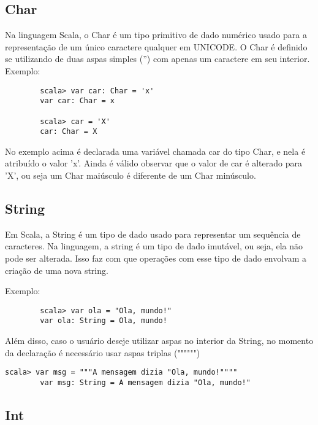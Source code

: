     \subsection{Char}
    Na linguagem Scala, o Char \'{e} um tipo primitivo de dado num\'{e}rico usado para a representa\c{c}\~{a}o de um \'{u}nico caractere qualquer em UNICODE. O Char \'{e} definido se utilizando de duas aspas simples ('') com apenas um caractere em seu interior.
    Exemplo:
    
    \begin{lstlisting}
    	scala> var car: Char = 'x'
    	var car: Char = x
    	
    	scala> car = 'X'
    	car: Char = X
    \end{lstlisting}
	
	No exemplo acima \'{e} declarada uma vari\'{a}vel chamada car do tipo Char, e nela \'{e} atribu\'{i}do o valor 'x'. Ainda \'{e} v\'{a}lido observar que o valor de car \'{e} alterado para 'X', ou seja um Char mai\'{u}sculo \'{e} diferente de um Char min\'{u}sculo.
	
	\subsection{String}
	
	Em Scala, a String \'{e} um tipo de dado usado para representar um sequ\^{e}ncia de caracteres. Na linguagem, a string \'{e} um tipo de dado imut\'{a}vel, ou seja, ela não pode ser alterada. Isso faz com que opera\c{c}\~{o}es com esse tipo de dado envolvam a cria\c{c}\~{a}o de uma nova string.
    
    Exemplo:
    
    \begin{lstlisting}
    	scala> var ola = "Ola, mundo!"
    	var ola: String = Ola, mundo!
    \end{lstlisting}

	Al\'{e}m disso, caso o usu\'{a}rio deseje utilizar aspas no interior da String, no momento da declara\c{c}\~{a}o \'{e} necess\'{a}rio usar aspas triplas ("""""")
	
	\begin{lstlisting}[breaklines]
		scala> var msg = """A mensagem dizia "Ola, mundo!""""
		var msg: String = A mensagem dizia "Ola, mundo!"
	\end{lstlisting}

	\subsection{Int}
	 
